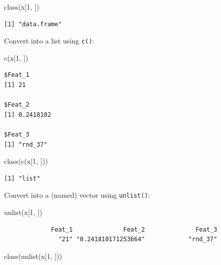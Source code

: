 \documentclass[
]{book}
\newenvironment{Shaded}{\begin{snugshade}}{\end{snugshade}}
\newcommand{\DecValTok}[1]{\textcolor[rgb]{0.00,0.00,0.81}{#1}}
\newcommand{\FunctionTok}[1]{\textcolor[rgb]{0.00,0.00,0.00}{#1}}
\newcommand{\NormalTok}[1]{#1}
\begin{document}
\begin{Shaded}
\begin{Highlighting}[]
\FunctionTok{class}\NormalTok{(x[}\DecValTok{1}\NormalTok{, ])}
\end{Highlighting}
\end{Shaded}

\begin{verbatim}
[1] "data.frame"
\end{verbatim}

Convert into a list using \texttt{c()}:

\begin{Shaded}
\begin{Highlighting}[]
\FunctionTok{c}\NormalTok{(x[}\DecValTok{1}\NormalTok{, ])}
\end{Highlighting}
\end{Shaded}

\begin{verbatim}
$Feat_1
[1] 21

$Feat_2
[1] 0.2418102

$Feat_3
[1] "rnd_37"
\end{verbatim}

\begin{Shaded}
\begin{Highlighting}[]
\FunctionTok{class}\NormalTok{(}\FunctionTok{c}\NormalTok{(x[}\DecValTok{1}\NormalTok{, ]))}
\end{Highlighting}
\end{Shaded}

\begin{verbatim}
[1] "list"
\end{verbatim}

Convert into a (named) vector using \texttt{unlist()}:

\begin{Shaded}
\begin{Highlighting}[]
\FunctionTok{unlist}\NormalTok{(x[}\DecValTok{1}\NormalTok{, ])}
\end{Highlighting}
\end{Shaded}

\begin{verbatim}
             Feat_1              Feat_2              Feat_3 
               "21" "0.241810171253664"            "rnd_37" 
\end{verbatim}

\begin{Shaded}
\begin{Highlighting}[]
\FunctionTok{class}\NormalTok{(}\FunctionTok{unlist}\NormalTok{(x[}\DecValTok{1}\NormalTok{, ]))}
\end{Highlighting}
\end{Shaded}
\end{document}
